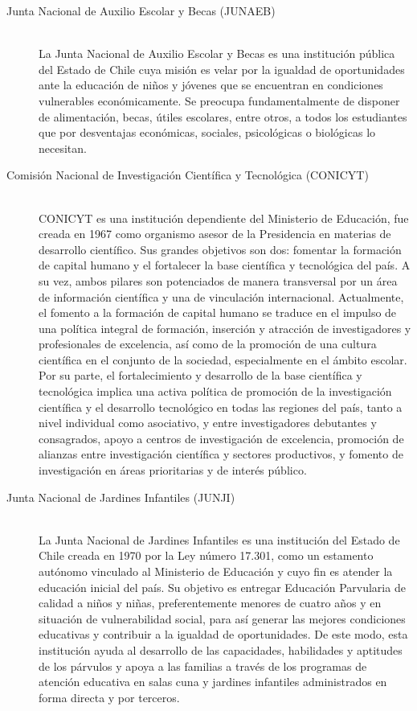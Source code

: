 \begin{description}
\item[Junta Nacional de Auxilio Escolar y Becas (JUNAEB)] \hfill \\
La Junta Nacional de Auxilio Escolar y Becas es una institución pública del Estado de Chile cuya misión es velar por la igualdad de oportunidades ante la educación de niños y jóvenes que se encuentran en condiciones vulnerables económicamente. 
Se preocupa fundamentalmente de disponer de alimentación, becas, útiles escolares, entre otros, a todos los estudiantes que por desventajas económicas, sociales, psicológicas o biológicas lo necesitan. \cite{junaeb}
\item[Comisión Nacional de Investigación Científica y Tecnológica (CONICYT)] \hfill \\
CONICYT es una institución dependiente del Ministerio de Educación, fue creada en 1967 como organismo asesor de la Presidencia en materias de desarrollo científico. Sus grandes objetivos son dos: fomentar la formación de capital humano y el fortalecer la base científica y tecnológica del país. A su vez, ambos pilares son potenciados de manera transversal por un área de información científica y una de vinculación internacional. 
 Actualmente, el fomento a la formación de capital humano se traduce en el impulso de una política integral de formación, inserción y atracción de investigadores y profesionales de excelencia, así como de la promoción de una cultura científica en el conjunto de la sociedad, especialmente en el ámbito escolar. Por su parte, el fortalecimiento y desarrollo de la base científica y tecnológica implica una activa política de promoción de la investigación científica y el desarrollo tecnológico en todas las regiones del país, tanto a nivel individual como asociativo, y entre investigadores debutantes y consagrados, apoyo a centros de investigación de excelencia, promoción de alianzas entre investigación científica y sectores productivos, y fomento de investigación en áreas prioritarias y de interés público. \cite{conicyt}
\item[Junta Nacional de Jardines Infantiles (JUNJI)] \hfill \\
La Junta Nacional de Jardines Infantiles es una institución del Estado de Chile creada en 1970 por la Ley número 17.301, como un estamento autónomo vinculado al Ministerio de Educación y cuyo fin es atender la educación inicial del país.
Su objetivo es entregar Educación Parvularia de calidad a niños y niñas, preferentemente menores de cuatro años y en situación de vulnerabilidad social, para así generar las mejores condiciones educativas y contribuir a la igualdad de oportunidades. De este modo, esta institución ayuda al desarrollo de las capacidades, habilidades y aptitudes de los párvulos y apoya a las familias a través de los programas de atención educativa en salas cuna y jardines infantiles administrados en forma directa y por terceros.\cite{junji}

\end{description}
